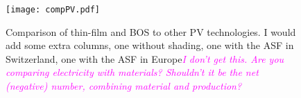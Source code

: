 
\begin{figure}[H]
\begin{center}
\texttt{[image: compPV.pdf]}
\caption{Comparison of thin-film and BOS to other PV technologies. I would add some extra columns, one without shading, one with the ASF in Switzerland, one with the ASF in Europe\textcolor{magenta}{\textit{I don't get this. Are you comparing electricity with materials? Shouldn't it be the net (negative) number, combining material and production?}}}
\label{fig:compPV}
\end{center}
\end{figure}







